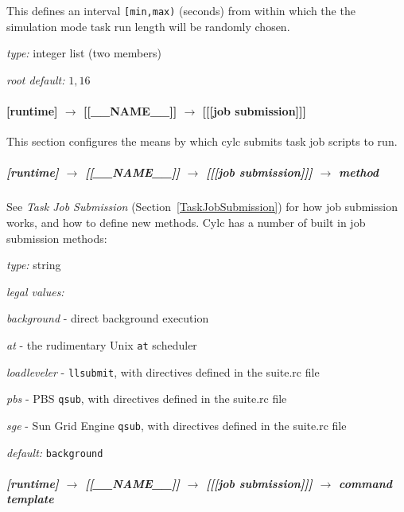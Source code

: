 This defines an interval \lstinline=[min,max)= (seconds) from within
which the the simulation mode task run length will be randomly chosen.

\begin{myitemize}
\item {\em type:} integer list (two members)
\item {\em root default:} $1,16$
\end{myitemize}

\paragraph[{[[[}job submission{]]]}]{[runtime] $\rightarrow$ [[\_\_NAME\_\_]] $\rightarrow$ [[[job submission]]]}

This section configures the means by which cylc submits task job scripts to run.

\subparagraph[method]{[runtime] $\rightarrow$ [[\_\_NAME\_\_]] $\rightarrow$ [[[job submission]]] $\rightarrow$ method}
\label{RuntimeJobSubMethods}

See {\em Task Job Submission} (Section~\ref{TaskJobSubmission}) 
for how job submission works, and how to define new methods.
Cylc has a number of built in job submission methods:
\begin{myitemize}
\item {\em type:} string
\item {\em legal values:} 
   \begin{myitemize}
       \item {\em background} - direct background execution
       \item {\em at} - the rudimentary Unix \lstinline=at= scheduler
       \item {\em loadleveler} - \lstinline=llsubmit=, with directives defined in the suite.rc file 
       \item {\em pbs} - PBS \lstinline=qsub=, with directives defined in the suite.rc file 
       \item {\em sge} - Sun Grid Engine \lstinline=qsub=, with directives defined in the suite.rc file 
   \end{myitemize}
\item {\em default:} \lstinline=background=
\end{myitemize}

\subparagraph[command template]{[runtime] $\rightarrow$ [[\_\_NAME\_\_]] $\rightarrow$ [[[job submission]]] $\rightarrow$ command template}

